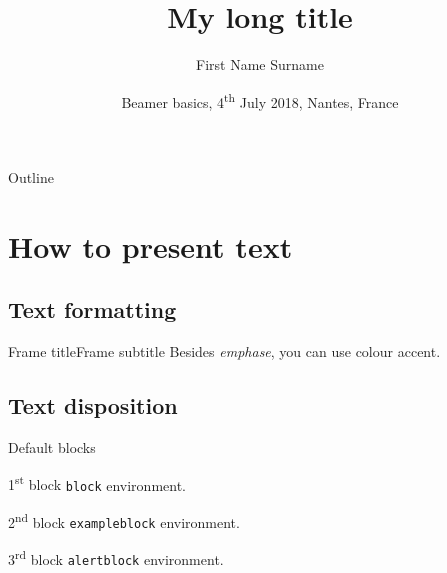 \documentclass{beamer}
\title[My short title]{My long title}
\author[F.\,N. Surname ]{First Name Surname}
\institute[Short affiliation]{My long affiliation}
\date[2018-07-04]{Beamer basics, 4\textsuperscript{th} July 2018, Nantes, France}
\begin{document}
\maketitle{}

\begin{frame}{Outline}
  \tableofcontents{}
\end{frame}

\section{How to present text}

\subsection{Text formatting}

\begin{frame}{Frame title}{Frame subtitle}
  Besides \emph{emphase}, you can use colour \alert{accent}.
\end{frame}

\subsection{Text disposition}

\begin{frame}{Default blocks}
  
  \begin{block}{1\textsuperscript{st} block}
    \texttt{block} environment.
  \end{block}
  
  \begin{exampleblock}{2\textsuperscript{nd} block}
    \texttt{exampleblock} environment.
  \end{exampleblock}
  
  \begin{alertblock}{3\textsuperscript{rd} block}
    \texttt{alertblock} environment.
  \end{alertblock}
  
\end{frame}
\end{document}
